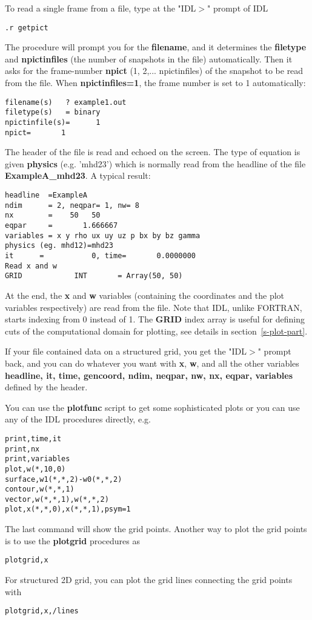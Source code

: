    To read a single frame from a file, type at the "IDL$>$" prompt of IDL
\begin{verbatim}
.r getpict
\end{verbatim}
   The procedure will prompt you for the {\bf filename}, 
   and it determines the {\bf filetype} and {\bf npictinfiles}
   (the number of snapshots in the file) automatically. Then it asks for
   the frame-number {\bf npict} (1, 2,... npictinfiles) 
   of the snapshot to be read from the file. When {\bf npictinfiles=1},
   the frame number is set to 1 automatically:
\begin{verbatim}
filename(s)   ? example1.out
filetype(s)   = binary
npictinfile(s)=      1
npict=       1
\end{verbatim}
   The header of the file is read and echoed on the screen. The
   type of equation is given {\bf physics} (e.g. 'mhd23') 
   which is normally read from the headline of the file {\bf ExampleA\_mhd23}.
   A typical result:
\begin{verbatim}
headline  =ExampleA
ndim      = 2, neqpar= 1, nw= 8
nx        =    50   50
eqpar     =       1.666667
variables = x y rho ux uy uz p bx by bz gamma
physics (eg. mhd12)=mhd23
it      =           0, time=       0.0000000
Read x and w
GRID            INT       = Array(50, 50)
\end{verbatim}
   At the end, the {\bf x} and {\bf w} variables (containing the coordinates 
   and the plot variables respectively) are read from the file. 
   Note that IDL, unlike FORTRAN, starts indexing from 0 instead of 1. 
   The {\bf GRID} index array is useful for defining
   cuts of the computational domain for plotting, see details 
   in section~\ref{s-plot-part}. 

   If your file contained data on a structured grid, you get the "IDL$>$"
   prompt back, and you can do whatever you want with {\bf x}, {\bf w}, 
   and all the other variables 
   {\bf headline, it, time, gencoord, ndim, neqpar, nw, nx, eqpar, variables}
   defined by the header. 

   You can use the {\bf {\bf plotfunc}} script to get some 
   sophisticated plots or you can use any of the IDL procedures directly, e.g.
\begin{verbatim}
print,time,it
print,nx
print,variables
plot,w(*,10,0)
surface,w1(*,*,2)-w0(*,*,2)
contour,w(*,*,1)
vector,w(*,*,1),w(*,*,2)
plot,x(*,*,0),x(*,*,1),psym=1
\end{verbatim}
   The last command will show the grid points. Another way to plot the
   grid points is to use the {\bf plotgrid} procedures as
\begin{verbatim}
plotgrid,x
\end{verbatim}
   For structured 2D grid, you can plot the grid lines connecting
   the grid points with 
\begin{verbatim}
plotgrid,x,/lines
\end{verbatim}

